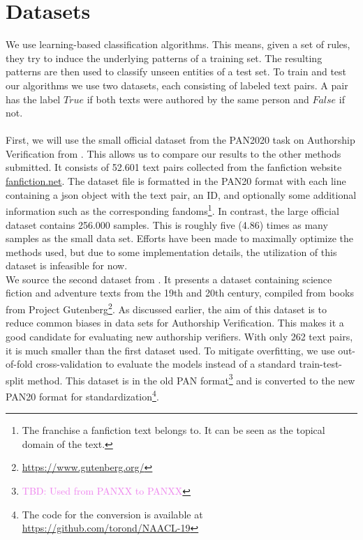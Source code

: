 \section{Datasets}
We use learning-based classification algorithms.
This means, given a set of rules, they try to induce the underlying patterns of a training set.
The resulting patterns are then used to classify unseen entities of a test set.
To train and test our algorithms we use two datasets, each consisting of labeled text pairs.
A pair has the label $True$ if both texts were authored by the same person and $False$ if not.\\\\
First, we will use the small official dataset from the PAN2020 task on Authorship Verification from \cite{bevendorff2020overview}.
This allows us to compare our results to the other methods submitted.
It consists of 52.601 text pairs collected from the fanfiction website \url{fanfiction.net}.
The dataset file is formatted in the PAN20 format with each line containing a json object with the text pair, an ID, and optionally some additional information such as the corresponding fandoms\footnote{The franchise a fanfiction text belongs to. It can be seen as the topical domain of the text.}.
In contrast, the large official dataset contains 256.000 samples.
This is roughly five (4.86) times as many samples as the small data set.
Efforts have been made to maximally optimize the methods used, but due to some implementation details, the utilization of this dataset is infeasible for now.\\
We source the second dataset from \cite{stein2019unbiasedGutenbergCorpus}.
It presents a dataset containing science fiction and adventure texts from the 19th and 20th century, compiled from books from Project Gutenberg\footnote{\url{https://www.gutenberg.org/}}.
As discussed earlier, the aim of this dataset is to reduce common biases in data sets for Authorship Verification.
This makes it a good candidate for evaluating new authorship verifiers.
With only 262 text pairs, it is much smaller than the first dataset used.
To mitigate overfitting, we use out-of-fold cross-validation to evaluate the models instead of a standard train-test-split method.
This dataset is in the old PAN format\footnote{\textcolor{violet}{TBD: Used from PANXX to PANXX}} and is converted to the new PAN20 format for standardization\footnote{The code for the conversion is available at \url{https://github.com/torond/NAACL-19}}.\\

